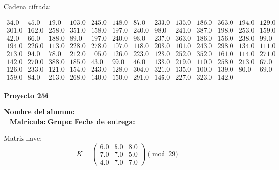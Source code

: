 \documentclass[12pt]{article}
\begin{document}
Cadena cifrada:
\begin{center}
$\begin{array}{lllllllllllll}
34.0 & 45.0 & 19.0 & 103.0 & 245.0 & 148.0 & 87.0 & 233.0 & 135.0 & 186.0 & 363.0 & 194.0 & 129.0\\
301.0 & 162.0 & 258.0 & 351.0 & 158.0 & 197.0 & 240.0 & 98.0 & 241.0 & 387.0 & 198.0 & 253.0 & 159.0\\
42.0 & 66.0 & 188.0 & 89.0 & 197.0 & 240.0 & 98.0 & 237.0 & 363.0 & 186.0 & 156.0 & 238.0 & 99.0\\
194.0 & 226.0 & 113.0 & 228.0 & 278.0 & 107.0 & 118.0 & 208.0 & 101.0 & 243.0 & 298.0 & 134.0 & 111.0\\
213.0 & 94.0 & 78.0 & 212.0 & 105.0 & 126.0 & 223.0 & 128.0 & 252.0 & 352.0 & 161.0 & 114.0 & 271.0\\
142.0 & 270.0 & 388.0 & 185.0 & 43.0 & 99.0 & 46.0 & 138.0 & 219.0 & 110.0 & 258.0 & 213.0 & 67.0\\
126.0 & 233.0 & 121.0 & 154.0 & 243.0 & 128.0 & 304.0 & 321.0 & 135.0 & 100.0 & 139.0 & 80.0 & 69.0\\
159.0 & 84.0 & 213.0 & 268.0 & 140.0 & 150.0 & 291.0 & 146.0 & 227.0 & 323.0 & 142.0\\
\end{array}$
\end{center}

\newpage


\textbf{Proyecto 256}

\textbf{Nombre del alumno:} \underline{\hspace{13cm}}\\\
\vspace{1cm}
\textbf{Matrícula:} \underline{\hspace{4cm}} \hspace{1cm}
\textbf{Grupo:} \underline{\hspace{2cm}}
\textbf{Fecha de entrega:} \underline{\hspace{2cm}}

\medskip

Matriz llave:
\[
K = \begin{pmatrix}
6.0 & 5.0 & 8.0\\
7.0 & 7.0 & 5.0\\
4.0 & 7.0 & 7.0
\end{pmatrix} \pmod{29}
\]
\end{document}
